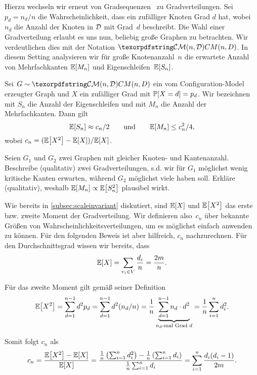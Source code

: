Hierzu wechseln wir erneut von Gradsequenzen~\degseq{} zu Gradverteilungen.
Sei $p_d = n_d / n$ die Wahrscheinlichkeit, dass ein zufälliger Knoten Grad $d$ hat, wobei $n_d$ die Anzahl der Knoten in $\mathcal{D}$ mit Grad~$d$ beschreibt.
Die Wahl einer Gradverteilung erlaubt es uns nun, beliebig große Graphen zu betrachten.
Wir verdeutlichen dies mit der Notation $\CMnd$.
In diesem Setting analysieren wir für große Knotenanzahl~$n$ die erwartete Anzahl von Mehrfachkanten $\mathbb{E}\!\left[M_n\right]$ und Eigenschleifen~$\mathbb{E}\!\left[S_n\right]$.

\begin{lemma}\label{lem:cm_anzahl_nicht_einfach}
    Sei $G \follows \CMnd$ ein vom Configuration-Model erzeugter Graph und $X$ ein zufälliger Grad mit $\mathbb{P}\!\left[X = d\right] = p_d$.
    Wir bezeichnen mit $S_n$ die Anzahl der Eigenschleifen und mit $M_n$ die Anzahl der Mehrfachkanten.
    Dann gilt
    \begin{equation}
        \mathbb{E}\!\left[S_n\right] \approx c_n/2 \qquad \text{und} \qquad \mathbb{E}\!\left[M_n\right] \le c_n^2 / 4,
    \end{equation}
    wobei $c_n = (\mathbb{E}\!\left[X^2\right] - \mathbb{E}\!\left[X\right]) / \mathbb{E}\!\left[X\right]$.
\end{lemma}

\begin{exercise}
    Seien $G_1$ und $G_2$ zwei Graphen mit gleicher Knoten- und Kantenanzahl.
    Beschreibe (qualitativ) zwei Gradverteilungen, s.d. wir für $G_1$ möglichst wenig kritische Kanten erwarten, während $G_2$ möglichst viele haben soll.
    Erkläre (qualitativ), weshalb $\mathbb{E}\!\left[M_n\right] \propto \mathbb{E}\!\left[S_n^2\right]$ plausibel wirkt.
\end{exercise}

\begin{remark}
    Wie bereits in \cref{subsec:scaleinvariant} diskutiert, sind $\mathbb{E}\!\left[X\right]$ und $\mathbb{E}\!\left[X^2\right]$ das erste bzw. zweite Moment der Gradverteilung.
    Wir definieren also~$c_n$ über bekannte Größen von Wahrscheinlichkeitsverteilungen, um es möglichst einfach anwenden zu können.
    Für den folgenden Beweis ist aber hilfreich, $c_n$ nachzurechnen.
    Für den Durchschnittsgrad wissen wir bereits, dass
    \begin{equation}
        \mathbb{E}\!\left[X\right] = \sum_{v_i \in V} \frac{d_i}{n} = \frac {2m}{n}.
    \end{equation}

    \noindent
    Für das zweite Moment gilt gemäß seiner Definition
    \begin{equation}
        \mathbb{E}\!\left[X^2\right]
        = \sum_{d=1}^{n-1} d^2 p_d
        = \sum_{d=1}^{n-1} d^2 (n_d / n)
        = \frac 1 n \underbrace{\sum_{d=1}^{n-1} n_d \cdot d^2}_\text{$n_d$-mal Grad $d$}
        = \frac 1 n \sum_{i=1}^n d_i^2.
    \end{equation}

    \noindent
    Somit folgt $c_n$ als
    \begin{equation}
        c_n
        = \frac{\mathbb{E}\!\left[X^2\right] - \mathbb{E}\!\left[X\right]}{\mathbb{E}\!\left[X\right]}
        = \frac{ \frac 1 n \left(\sum_{i=1}^n d_i^2\right) - \frac 1 n \left(\sum_{i=1}^n d_i\right)}{\frac 1 n \sum_{i=1}^n d_i}
        = \sum_{i=1}^n \frac{d_i (d_i - 1)}{2m}.
    \end{equation}
\end{remark}

